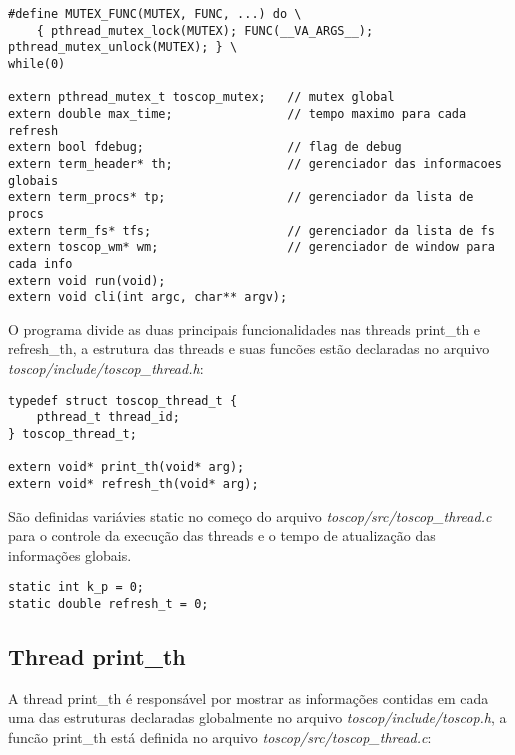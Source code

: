 \documentclass{article}
\begin{document}
\begin{verbatim}
#define MUTEX_FUNC(MUTEX, FUNC, ...) do \
    { pthread_mutex_lock(MUTEX); FUNC(__VA_ARGS__); pthread_mutex_unlock(MUTEX); } \
while(0)

extern pthread_mutex_t toscop_mutex;   // mutex global
extern double max_time;                // tempo maximo para cada refresh
extern bool fdebug;                    // flag de debug
extern term_header* th;                // gerenciador das informacoes globais
extern term_procs* tp;                 // gerenciador da lista de procs
extern term_fs* tfs;                   // gerenciador da lista de fs
extern toscop_wm* wm;                  // gerenciador de window para cada info
extern void run(void);
extern void cli(int argc, char** argv); 
\end{verbatim}

O programa divide as duas principais funcionalidades nas threads
print\_th e refresh\_th, a estrutura das threads e suas funcões estão 
declaradas no arquivo \textit{toscop/include/toscop\_thread.h}:

\begin{verbatim}
typedef struct toscop_thread_t {
    pthread_t thread_id;
} toscop_thread_t;

extern void* print_th(void* arg);
extern void* refresh_th(void* arg);
\end{verbatim}

São definidas variávies static no começo do arquivo \textit{toscop/src/toscop\_thread.c}
 para o controle da execução das threads e o tempo de atualização das informações globais.

\begin{verbatim}
static int k_p = 0;
static double refresh_t = 0;
\end{verbatim}

\subsection{Thread print\_th}

A thread print\_th é responsável por mostrar as informações contidas
em cada uma das estruturas declaradas globalmente no arquivo 
\textit{toscop/include/toscop.h}, a funcão print\_th está definida 
no arquivo \textit{toscop/src/toscop\_thread.c}:
\end{document}
